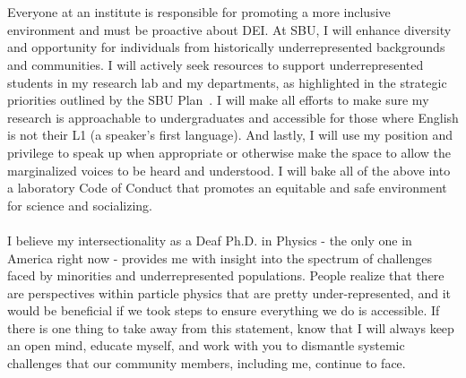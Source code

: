 \documentclass[10pt,a4paper,sans]{moderncv} %
\begin{document}
\\
\\
Everyone at an institute is responsible for promoting a more inclusive environment and must be proactive about DEI. At SBU, I will enhance diversity and opportunity for individuals from historically underrepresented backgrounds and communities. I will actively seek resources to support underrepresented students in my research lab and my departments, as highlighted in the strategic priorities outlined by the SBU Plan~\cite{campusplan}. I will make all efforts to make sure my research is approachable to undergraduates and accessible for those where English is not their L1 (a speaker's first language). And lastly, I will use my position and privilege to speak up when appropriate or otherwise make the space to allow the marginalized voices to be heard and understood. I will bake all of the above into a laboratory Code of Conduct that promotes an equitable and safe environment for science and socializing.
\\
\\
I believe my intersectionality as a Deaf Ph.D. in Physics - the only one in America right now - provides me with insight into the spectrum of challenges faced by minorities and underrepresented populations. People realize that there are perspectives within particle physics that are pretty under-represented, and it would be beneficial if we took steps to ensure everything we do is accessible. If there is one thing to take away from this statement, know that I will always keep an open mind, educate myself, and work with you to dismantle systemic challenges that our community members, including me, continue to face.

\printbibliography
\end{document}
